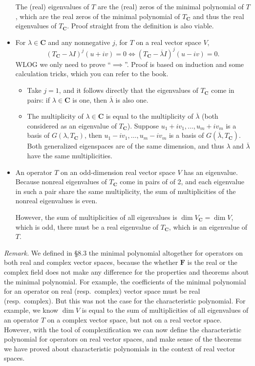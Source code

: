 \documentclass{article}
\newcommand{\C}{\mathbf{C}}
\newcommand{\F}{\mathbf{F}}
\renewcommand{\d}{\dim}
\newcommand{\conj}[1]{\overline{#1}}
\begin{document}
\begin{itemize}
    The (real) eigenvalues of $T$ are the (real) zeros of the minimal polynomial of $T$, which are the real zeros of the minimal polynomial of $T_\C$ and thus the real eigenvalues of $T_\C$. Proof straight from the definition is also viable.
    \item For $\lambda \in \C$ and any nonnegative $j$, for $T$ on a real vector space $V$, \[(T_\C - \lambda I)^j (u+iv) = 0 \iff (T_\C - \conj{\lambda} I)^j (u-iv) = 0.\] WLOG we only need to prove ``$\implies$''. Proof is based on induction and some calculation tricks, which you can refer to the book.
    \begin{itemize}
        \item Take $j = 1$, and it follows directly that the eigenvalues of $T_\C$ come in pairs: if $\lambda \in \C$ is one, then $\conj{\lambda}$ is also one.
        \item The multiplicity of $\lambda \in \C$ is equal to the multiplicity of $\conj{\lambda}$ (both considered as an eigenvalue of $T_\C$). Suppose $u_1+iv_1,\dots,u_m+iv_m$ is a basis of $G(\lambda, T_\C)$, then $u_1-iv_1,\dots,u_m-iv_m$ is a basis of  $G(\conj{\lambda}, T_\C)$. Both generalized eigenspaces are of the same dimension, and thus $\lambda$ and $\conj{\lambda}$ have the same multiplicities.
    \end{itemize}
    \item An operator $T$ on an odd-dimension real vector space $V$ has an eigenvalue. Because nonreal eigenvalues of $T_\C$ come in pairs of of 2, and each eigenvalue in such a pair share the same multiplicity, the sum of multiplicities of the nonreal eigenvalues is even.
    
    However, the sum of multiplicities of all eigenvalues is $\d V_\C = \d V$, which is odd, there must be a real eigenvalue of $T_\C$, which is an eigenvalue of $T$.
\end{itemize}
\textit{Remark.} We defined in \S 8.3 the minimal polynomial altogether for operators on both real and complex vector spaces, because the whether $\F$ is the real or the complex field does not make any difference for the properties and theorems about the minimal polynomial. For example, the coefficients of the minimal polynomial for an operator on real (resp.\ complex) vector space must be real (resp.\ complex). But this was not the case for the characteristic polynomial. For example, we know $\d V$ is equal to the sum of multiplicities of all eigenvalues of an operator $T$ on a complex vector space, but not on a real vector space. However, with the tool of complexification we can now define the characteristic polynomial for operators on real vector spaces, and make sense of the theorems we have proved about characteristic polynomials in the context of real vector spaces.
\end{document}
